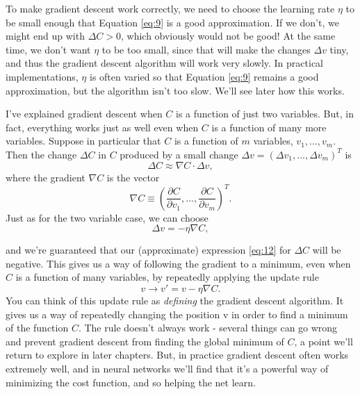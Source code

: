 \documentclass[a4paper,twoside,10pt]{book}
\begin{document}
To make gradient descent work correctly, we need to choose the learning rate $\eta$ to be small enough that Equation \ref{eq:9} is a good approximation. If we don't, we might end up with $\Delta C > 0$, which obviously would not be good! At the same time, we don't want $\eta$ to be too small, since that will make the changes $\Delta v$ tiny, and thus the gradient descent algorithm will work very slowly. In practical implementations, $\eta$ is often varied so that Equation \ref{eq:9} remains a good approximation, but the algorithm isn't too slow. We'll see later how this works.

I've explained gradient descent when $C$ is a function of just two variables. But, in fact, everything works just as well even when $C$ is a function of many more variables. Suppose in particular that $C$ is a function of $m$ variables, $v_1, \ldots,v_m$. Then the change $\Delta C$ in $C$ produced by a small change $\Delta v = (\Delta v_1, \ldots, \Delta v_m)^T$ is
\begin{equation}
	\Delta C \approx \nabla C \cdot \Delta v,
	\label{eq:12}
\end{equation}
where the gradient $\nabla C$ is the vector
\begin{equation}
\nabla C \equiv \left(\frac{\partial C}{\partial v_1}, \ldots, \frac{\partial C}{\partial v_m}\right)^T.
\label{eq:13}
\end{equation}
Just as for the two variable case, we can choose
\begin{equation}
\Delta v = -\eta \nabla C, \label{eq:14}
\end{equation}

and we're guaranteed that our (approximate) expression \ref{eq:12} for $\Delta C$ will be negative. This gives us a way of following the gradient to a minimum, even when $C$ is a function of many variables, by repeatedly applying the update rule
\begin{equation}
v \rightarrow v' = v-\eta \nabla C.
\label{eq:15}
\end{equation}
You can think of this update rule as \textit{defining} the gradient descent algorithm. It gives us a way of repeatedly changing the position v in order to find a minimum of the function $C$. The rule doesn't always work - several things can go wrong and prevent gradient descent from finding the global minimum of $C$, a point we'll return to explore in later chapters. But, in practice gradient descent often works extremely well, and in neural networks we'll find that it's a powerful way of minimizing the cost function, and so helping the net learn.
\end{document}
